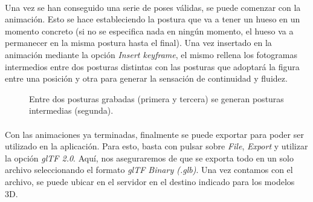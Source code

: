 \documentclass{subfiles}
\begin{document}
    \paragraph{}
    Una vez se han conseguido una serie de poses válidas, se puede comenzar con la animación. Esto se hace estableciendo la postura que va a tener un hueso en un momento concreto (si no se especifica nada en ningún momento, el hueso va a permanecer en la misma postura hasta el final). Una vez insertado en la animación mediante la opción \textit{Insert keyframe}, el mismo \blender rellena los fotogramas intermedios entre dos posturas distintas con las posturas que adoptará la figura entre una posición y otra para generar la sensación de continuidad y fluidez.

    \begin{figure}%
    \centering
    \caption{Entre dos posturas grabadas (primera y tercera) se generan posturas intermedias (segunda).}
    \label{fig:4.2.2_pose_transition}
    \end{figure}

    \paragraph{}
    Con las animaciones ya terminadas, finalmente se puede exportar para poder ser utilizado en la aplicación. Para esto, basta con pulsar sobre \textit{File}, \textit{Export} y utilizar la opción \textit{glTF 2.0}. Aquí, nos aseguraremos de que se exporta todo en un solo archivo seleccionando el formato \textit{glTF Binary (.glb)}. Una vez contamos con el archivo, se puede ubicar en el servidor en el destino indicado para los modelos 3D.
\end{document}
